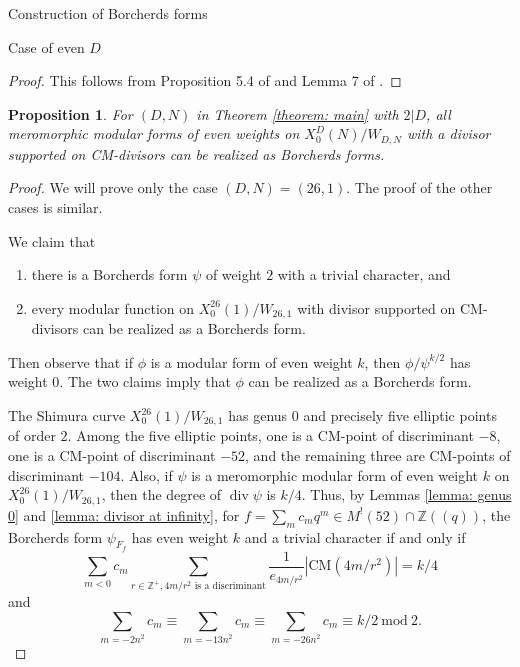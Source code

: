 \documentclass{amsart}
\newcounter{lemma}
\newtheorem{Proposition}[lemma]{Proposition}
\theoremstyle{definition}
\def\Z{\mathbb Z}
\def\mod{\  \mathrm{mod}\ }
\def\CM{\mathrm{CM}}
\def\div{\operatorname{div}}
\begin{document}
\begin{section}{Construction of Borcherds forms}
\begin{subsection}{Case of even $D$}
\begin{proof} This follows from Proposition 5.4 of \cite{Errthum}
  and Lemma 7 of \cite{Yang-CM}.
\end{proof}

\begin{Proposition} \label{proposition: all Borcherds}
  For $(D,N)$ in Theorem \ref{theorem: main} with $2|D$,
  all meromorphic modular forms of even weights on $X_0^D(N)/W_{D,N}$
  with a divisor supported on CM-divisors can be realized as Borcherds
  forms.
\end{Proposition}

\begin{proof} We will prove only the case $(D,N)=(26,1)$. The proof of
  the other cases is similar.

  We claim that
  \begin{enumerate}
  \item[(i)] there is a Borcherds form $\psi$ of weight $2$ with a trivial
    character, and
  \item[(ii)] every modular function on $X_0^{26}(1)/W_{26,1}$ with
    divisor supported on CM-divisors can be realized as a Borcherds
    form.
  \end{enumerate}
  Then observe that if $\phi$ is a modular form of even weight $k$,
  then $\phi/\psi^{k/2}$ has weight $0$. The two claims imply that
  $\phi$ can be realized as a Borcherds form.

  The Shimura curve $X_0^{26}(1)/W_{26,1}$ has genus $0$ and precisely
  five elliptic points of order $2$. Among the five elliptic points,
  one is a CM-point of discriminant $-8$, one is a CM-point of
  discriminant $-52$, and the remaining three are CM-points of
  discriminant $-104$. Also, if $\psi$ is a meromorphic modular form
  of even weight $k$ on $X_0^{26}(1)/W_{26,1}$, then the degree of
  $\div\psi$ is $k/4$. Thus, by Lemmas \ref{lemma: genus 0} and \ref{lemma:
    divisor at infinity}, for $f=\sum_mc_mq^m\in M^!(52)\cap\Z((q))$,
  the Borcherds form $\psi_{F_f}$ has even weight $k$ and a trivial
  character if and only if
  \begin{equation} \label{equation: 26 condition 1}
    \sum_{m<0}c_m\sum_{r\in\Z^+,4m/r^2\text{ is a discriminant}}
    \frac1{e_{4m/r^2}}|\CM(4m/r^2)|=k/4
  \end{equation}
  and
  \begin{equation} \label{equation: 26 condition 2}
    \sum_{m=-2n^2}c_m\equiv\sum_{m=-13n^2}c_m\equiv
    \sum_{m=-26n^2}c_m\equiv k/2 \mod 2.
  \end{equation}


\end{proof}
\end{subsection}
\end{section}
\end{document}
